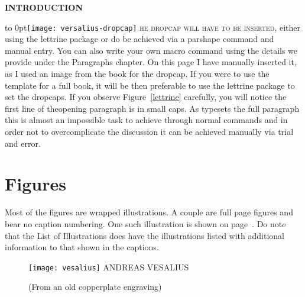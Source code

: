 \LARGE\bfseries INTRODUCTION\par
\egroup
\def\dropcapversalius{%
\vbox to 0pt{\vskip6pt\leavevmode\noindent\texttt{[image: versalius-dropcap]}%
}%
}
\parindent0pt

 
\dropcapversalius \textsc{he dropcap will have to be inserted}, either using the lettrine package or do be achieved via a parshape command and manual entry. You can also write your own macro command using the details we provide under the Paragraphs chapter. On this page I have manually inserted it, as I used an image from the book for the dropcap. If you were to use the template for a full book, it will be then preferable to use
the lettrine package to set the dropcaps. If you observe Figure~\ref{lettrine} carefully, you will notice the first line of theopening paragraph is in small caps. As \tex typesets the full paragraph this is almost an impossible task to achieve through normal \tex commands and in order not to overcomplicate the discussion it can be achieved manually via trial and error. 

\section{Figures}

Most of the figures are wrapped illustrations. A couple are full page figures and bear no caption numbering. One such illustration is shown on page~\pageref{fig:vesalius}. Do note that the List of Illustrations does have the illustrations listed with additional information to that shown in the captions. 

\begin{figure}[p]
\centering
\texttt{[image: vesalius]}
\centering
ANDREAS VESALIUS\par
(From an old copperplate engraving)\par
\label{fig:vesalius}
\end{figure}






